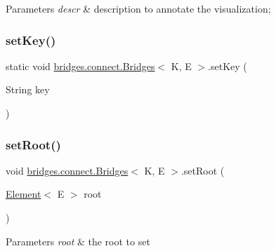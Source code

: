 \begin{DoxyParams}{Parameters}
{\em descr} & description to annotate the visualization; \\
\hline
\end{DoxyParams}
\hypertarget{classbridges_1_1connect_1_1_bridges_a484992ce3fce273ca2caa215a4488e3c}{}\label{classbridges_1_1connect_1_1_bridges_a484992ce3fce273ca2caa215a4488e3c} 
\subsubsection{\texorpdfstring{set\+Key()}{setKey()}}
{\footnotesize\ttfamily static void \hyperlink{classbridges_1_1connect_1_1_bridges}{bridges.\+connect.\+Bridges}$<$ K, E $>$.set\+Key (\begin{DoxyParamCaption}\item[{String}]{key }\end{DoxyParamCaption})\hspace{0.3cm}{\ttfamily [static]}}

\hypertarget{classbridges_1_1connect_1_1_bridges_aa05295718a1fefa2917dbaf874c79415}{}\label{classbridges_1_1connect_1_1_bridges_aa05295718a1fefa2917dbaf874c79415} 
\subsubsection{\texorpdfstring{set\+Root()}{setRoot()}}
{\footnotesize\ttfamily void \hyperlink{classbridges_1_1connect_1_1_bridges}{bridges.\+connect.\+Bridges}$<$ K, E $>$.set\+Root (\begin{DoxyParamCaption}\item[{\hyperlink{classbridges_1_1base_1_1_element}{Element}$<$ E $>$}]{root }\end{DoxyParamCaption})}


\begin{DoxyParams}{Parameters}
{\em root} & the root to set \\
\hline
\end{DoxyParams}
\hypertarget{classbridges_1_1connect_1_1_bridges_a90c7f6b2b99d88bf241ea7247db47045}{}\label{classbridges_1_1connect_1_1_bridges_a90c7f6b2b99d88bf241ea7247db47045} 
